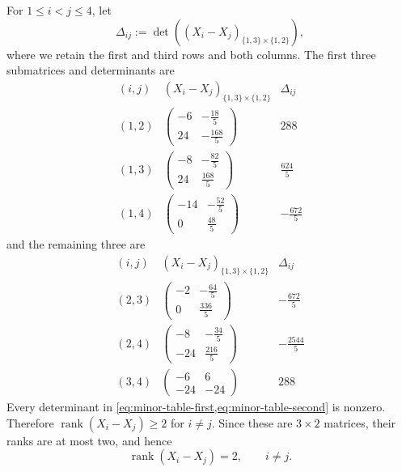 \documentclass[11pt,reqno]{amsart}
\theoremstyle{definition}
\DeclareMathOperator{\rank}{rank}
\begin{document}
For $1\le i<j\le4$, let
\begin{equation}
  \Delta_{ij}
  :=\det\left((X_i-X_j)_{\{1,3\}\times\{1,2\}}\right),
  \label{eq:minor-definition}
\end{equation}
where we retain the first and third rows and both columns.  The first three
submatrices and determinants are
\begin{equation}
\renewcommand{\arraystretch}{1.2}
\begin{array}{c|c|c}
  (i,j)&(X_i-X_j)_{\{1,3\}\times\{1,2\}}&\Delta_{ij}\\
  \hline
  (1,2)&\begin{pmatrix}-6&-\frac{18}{5}\\24&-\frac{168}{5}\end{pmatrix}
       &288\\
  (1,3)&\begin{pmatrix}-8&-\frac{82}{5}\\24&\frac{168}{5}\end{pmatrix}
       &\frac{624}{5}\\
  (1,4)&\begin{pmatrix}-14&-\frac{52}{5}\\0&\frac{48}{5}\end{pmatrix}
       &-\frac{672}{5}
\end{array}
\label{eq:minor-table-first}
\end{equation}
and the remaining three are
\begin{equation}
\renewcommand{\arraystretch}{1.2}
\begin{array}{c|c|c}
  (i,j)&(X_i-X_j)_{\{1,3\}\times\{1,2\}}&\Delta_{ij}\\
  \hline
  (2,3)&\begin{pmatrix}-2&-\frac{64}{5}\\0&\frac{336}{5}\end{pmatrix}
       &-\frac{672}{5}\\
  (2,4)&\begin{pmatrix}-8&-\frac{34}{5}\\-24&\frac{216}{5}\end{pmatrix}
       &-\frac{2544}{5}\\
  (3,4)&\begin{pmatrix}-6&6\\-24&-24\end{pmatrix}
       &288
\end{array}
\label{eq:minor-table-second}
\end{equation}
Every determinant in
\cref{eq:minor-table-first,eq:minor-table-second} is nonzero.  Therefore
$\rank(X_i-X_j)\ge2$ for $i\neq j$.  Since these are $3\times2$ matrices,
their ranks are at most two, and hence
\begin{equation}
  \rank(X_i-X_j)=2,
  \qquad i\neq j.
  \label{eq:rank-two-conclusion}
\end{equation}
\end{document}
